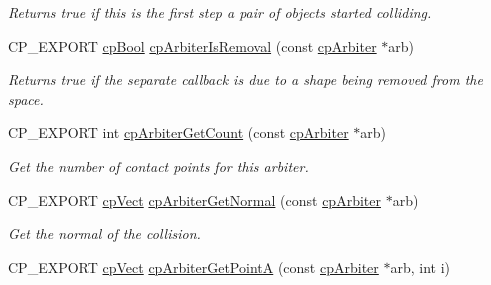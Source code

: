 \begin{DoxyCompactItemize}
\begin{DoxyCompactList}\small\item\em Returns true if this is the first step a pair of objects started colliding. \end{DoxyCompactList}\item 
\mbox{\label{group__cp_arbiter_gab8e123894234c06d2aa1b06072803d99}} 
C\+P\+\_\+\+E\+X\+P\+O\+RT \mbox{\hyperlink{group__basic_types_gabc5e752c48f3449ca26ef413ecbd647e}{cp\+Bool}} \mbox{\hyperlink{group__cp_arbiter_gab8e123894234c06d2aa1b06072803d99}{cp\+Arbiter\+Is\+Removal}} (const \mbox{\hyperlink{structcp_arbiter}{cp\+Arbiter}} $\ast$arb)
\begin{DoxyCompactList}\small\item\em Returns true if the separate callback is due to a shape being removed from the space. \end{DoxyCompactList}\item 
\mbox{\label{group__cp_arbiter_ga166184f2b2ce68a734e380e702763404}} 
C\+P\+\_\+\+E\+X\+P\+O\+RT int \mbox{\hyperlink{group__cp_arbiter_ga166184f2b2ce68a734e380e702763404}{cp\+Arbiter\+Get\+Count}} (const \mbox{\hyperlink{structcp_arbiter}{cp\+Arbiter}} $\ast$arb)
\begin{DoxyCompactList}\small\item\em Get the number of contact points for this arbiter. \end{DoxyCompactList}\item 
\mbox{\label{group__cp_arbiter_gaf433a0a6809f8366530adfb6538a1a1b}} 
C\+P\+\_\+\+E\+X\+P\+O\+RT \mbox{\hyperlink{structcp_vect}{cp\+Vect}} \mbox{\hyperlink{group__cp_arbiter_gaf433a0a6809f8366530adfb6538a1a1b}{cp\+Arbiter\+Get\+Normal}} (const \mbox{\hyperlink{structcp_arbiter}{cp\+Arbiter}} $\ast$arb)
\begin{DoxyCompactList}\small\item\em Get the normal of the collision. \end{DoxyCompactList}\item 
\mbox{\label{group__cp_arbiter_ga0c822e1157a0b5e3e95d3de5866f5af1}} 
C\+P\+\_\+\+E\+X\+P\+O\+RT \mbox{\hyperlink{structcp_vect}{cp\+Vect}} \mbox{\hyperlink{group__cp_arbiter_ga0c822e1157a0b5e3e95d3de5866f5af1}{cp\+Arbiter\+Get\+PointA}} (const \mbox{\hyperlink{structcp_arbiter}{cp\+Arbiter}} $\ast$arb, int i)

\end{DoxyCompactItemize}
